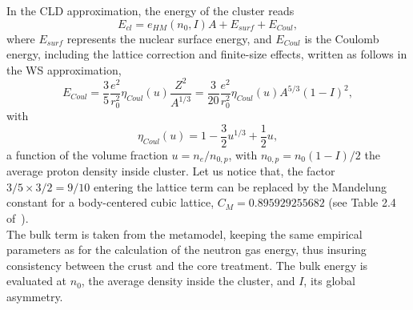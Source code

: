 In the CLD approximation, the energy of the cluster reads
%
\begin{equation}
  E_{cl} = e_{HM}(n_0, I)A + E_{surf} + E_{Coul},
\end{equation}
%
where $E_{surf}$ represents the nuclear surface energy, and $E_{Coul}$ is the Coulomb
energy, including the lattice correction and finite-size effects, written 
as follows in the WS approximation,
%
\begin{equation}
  E_{Coul} = \frac{3}{5}\frac{e^2}{r_0^2}\eta_{Coul}(u)\frac{Z^2}{A^{1/3}} =
  \frac{3}{20}\frac{e^2}{r_0^2}\eta_{Coul}(u)A^{5/3}(1-I)^2,\label{eq:ecoul}
\end{equation}
%
with
%
\begin{equation}
  \eta_{Coul}(u) = 1-\frac{3}{2}u^{1/3} + \frac{1}{2}u,\label{eq:fcoul}
\end{equation}
%
a function of the volume fraction $u = n_e/n_{0,p}$, with $n_{0,p} =
n_0(1-I)/2$ the average proton density inside cluster. Let us notice that, 
the factor $3/5 \times 3/2 = 9/10$ entering the lattice term can be
replaced by the Mandelung constant for a body-centered cubic lattice, $C_M =
0.895929255682$ (see Table 2.4 of~\cite{Haensel2007}).\\
The bulk term is taken from the metamodel, keeping the same empirical parameters
as for the calculation of the neutron gas energy, thus insuring consistency
between the crust and the core treatment. 
The bulk energy is evaluated at $n_0$, the average density inside the cluster, 
and $I$, its global asymmetry.

